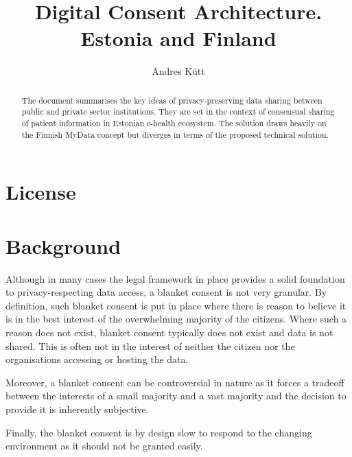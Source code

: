 \documentclass[nobib]{tufte-handout}
\title{Digital Consent Architecture.\\Estonia and Finland}
\author{Andres Kütt}
\begin{document}
\maketitle%

\begin{abstract}
\noindent
The document summarises the key ideas of privacy-preserving data sharing between public and private sector institutions. They are set in the context of consensual sharing of patient information in Estonian e-health ecosystem. The solution draws heavily on the Finnish MyData concept but diverges in terms of the proposed technical solution.

\end{abstract}
\section{License}
\doclicenseThis

\section{Background}
Although in many cases the legal framework in place provides a solid foundation to privacy-respecting data access, a blanket consent is not very granular. By definition, such blanket consent is put in place where there is reason to believe it is in the best interest of the overwhelming majority of the citizens. Where such a reason does not exist, blanket consent typically does not exist and data is not shared. This is often not in the interest of neither the citizen nor the organisations accessing or hosting the data. 

Moreover, a blanket consent can be controversial in nature as it forces a tradeoff between the interests of a small majority and a vast majority and the decision to provide it is inherently subjective. 

Finally, the blanket consent is by design slow to respond to the changing environment as it should not be granted easily.
\end{document}
